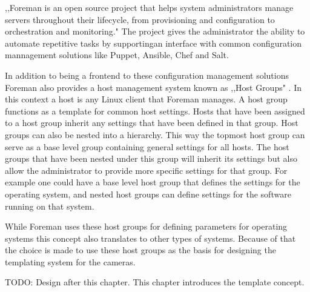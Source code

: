 ,,Foreman is an open source project that helps system administrators manage servers throughout their lifecycle, from provisioning and configuration to orchestration and monitoring." \cite{noauthor_foreman_nodate}
The project gives the administrator the ability to automate repetitive tasks by supportingan interface with common configuration mannagement solutions like Puppet, Ansible, Chef and Salt.

In addition to being a frontend to these configuration management solutions Foreman also provides a host management system known as ,,Host Groups" \cite{noauthor_foreman_nodate-1}. In this context a host is any Linux client that Foreman manages.
A host group functions as a template for common host settings.
Hosts that have been assigned to a host group inherit any settings that have been defined in that group.
Host groups can also be nested into a hierarchy.
This way the topmost host group can serve as a base level group containing general settings for all hosts.
The host groups that have been nested under this group will inherit its settings but also allow the administrator to provide more specific settings for that group.
For example one could have a base level host group that defines the settings for the operating system, and nested host groups can define settings for the software running on that system.

While Foreman uses these host groups for defining parameters for operating systems this concept also translates to other types of systems.
Because of that the choice is made to use these host groups as the basis for designing the templating system for the cameras.

TODO: Design after this chapter. This chapter introduces the template concept.
